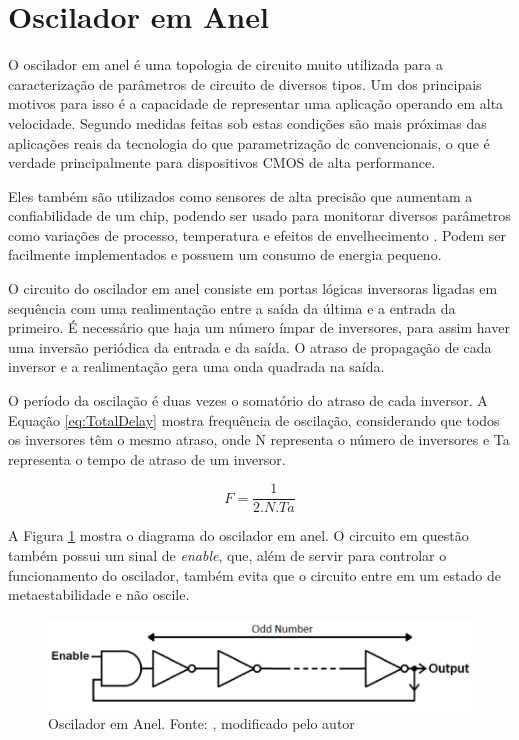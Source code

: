 \section{Oscilador em Anel}
O oscilador em anel é uma topologia de circuito muito utilizada para a caracterização de parâmetros de circuito de diversos tipos. Um dos principais motivos para isso é a capacidade de representar uma aplicação operando em alta velocidade. Segundo \cite{Bhushan} medidas feitas sob estas condições são mais próximas das aplicações reais da tecnologia do que parametrização dc convencionais, o que é verdade principalmente para dispositivos CMOS de alta performance.

Eles também são utilizados como sensores de alta precisão que aumentam a confiabilidade de um chip, podendo ser usado para monitorar diversos parâmetros como variações de processo, temperatura e efeitos de envelhecimento \cite{Sato}. Podem ser facilmente implementados e possuem um consumo de energia pequeno.

O circuito do oscilador em anel consiste em portas lógicas inversoras ligadas em sequência com uma realimentação entre a saída da última e a entrada da primeiro. É necessário que haja um número ímpar de inversores, para assim haver uma inversão periódica da entrada e da saída. O atraso de propagação de cada inversor e a realimentação gera uma onda quadrada na saída.

O período da oscilação é duas vezes o somatório do atraso de cada inversor. A Equação \ref{eq:TotalDelay} mostra frequência de oscilação, considerando que todos os inversores têm o mesmo atraso, onde N representa o número de inversores e Ta representa o tempo de atraso de um inversor.

\begin{equation}
    F = \frac{1}{2.N.Ta}
    \label{eq:TotalDelay}
\end{equation}
         
A Figura \ref{fig:RingOsc} mostra o diagrama do oscilador em anel. O circuito em questão também possui um sinal de \textit{enable}, que, além de servir para controlar o funcionamento do oscilador, também evita que o circuito entre em um estado de metaestabilidade e não oscile.

\begin{figure}[H]
    \centering
    \includegraphics[width=\linewidth]{figures/ReferencialTeorico/RingOscModified.png}
    \caption{Oscilador em Anel. Fonte: \cite{Sparkfun}, modificado pelo autor}
    \label{fig:RingOsc}
\end{figure}


